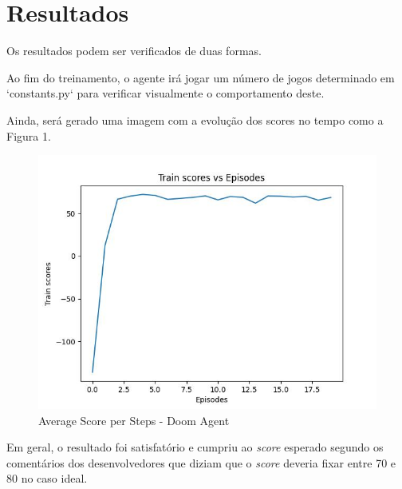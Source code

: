 \documentclass[12pt]{article}
\begin{document}
\section{Resultados}

Os resultados podem ser verificados de duas formas.

Ao fim do treinamento, o agente irá jogar um número de jogos determinado em `constants.py` para verificar visualmente o comportamento deste.

Ainda, será gerado uma imagem com a evolução dos scores no tempo como a Figura 1.

\begin{figure}[H]
    \centering
    \includegraphics[scale=.8]{src/img/results-20-epochs.jpg}
    \caption{Average Score per Steps - Doom Agent}
\end{figure}

Em geral, o resultado foi satisfatório e cumpriu ao \textit{score} esperado segundo os comentários dos desenvolvedores que diziam que o \textit{score} deveria fixar entre 70 e 80 no caso ideal.

\pagebreak
\printbibliography
\pagebreak
\end{document}

